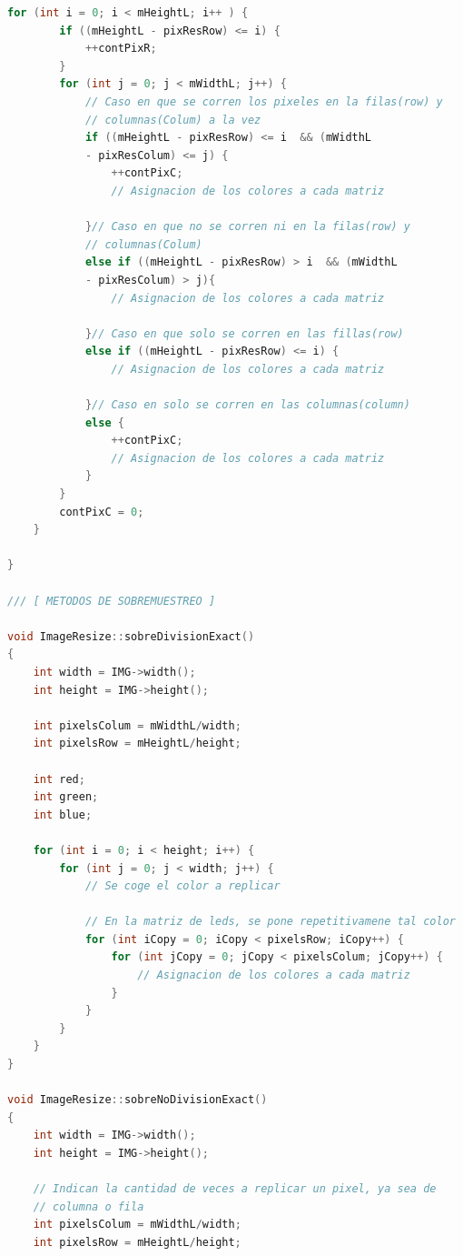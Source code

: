 \documentclass{article}
\begin{document}
\begin{lstlisting}[language=C++, label=codigo_matrices_int]
    for (int i = 0; i < mHeightL; i++ ) {
        if ((mHeightL - pixResRow) <= i) {
            ++contPixR;
        }
        for (int j = 0; j < mWidthL; j++) {
            // Caso en que se corren los pixeles en la filas(row) y
            // columnas(Colum) a la vez
            if ((mHeightL - pixResRow) <= i  && (mWidthL 
            - pixResColum) <= j) {
                ++contPixC;
                // Asignacion de los colores a cada matriz
                
            }// Caso en que no se corren ni en la filas(row) y 
            // columnas(Colum)
            else if ((mHeightL - pixResRow) > i  && (mWidthL 
            - pixResColum) > j){
                // Asignacion de los colores a cada matriz
                
            }// Caso en que solo se corren en las fillas(row)
            else if ((mHeightL - pixResRow) <= i) {
                // Asignacion de los colores a cada matriz
                
            }// Caso en solo se corren en las columnas(column)
            else {
                ++contPixC;
                // Asignacion de los colores a cada matriz
            }
        }
        contPixC = 0;
    }

}

/// [ METODOS DE SOBREMUESTREO ]

void ImageResize::sobreDivisionExact()
{
    int width = IMG->width();
    int height = IMG->height();

    int pixelsColum = mWidthL/width;
    int pixelsRow = mHeightL/height;

    int red;
    int green;
    int blue;

    for (int i = 0; i < height; i++) {
        for (int j = 0; j < width; j++) {
            // Se coge el color a replicar
            
            // En la matriz de leds, se pone repetitivamene tal color
            for (int iCopy = 0; iCopy < pixelsRow; iCopy++) {
                for (int jCopy = 0; jCopy < pixelsColum; jCopy++) {
                    // Asignacion de los colores a cada matriz
                }
            }
        }
    }
}

void ImageResize::sobreNoDivisionExact()
{
    int width = IMG->width();
    int height = IMG->height();

    // Indican la cantidad de veces a replicar un pixel, ya sea de
    // columna o fila
    int pixelsColum = mWidthL/width;
    int pixelsRow = mHeightL/height;


\end{lstlisting}
\end{document}
